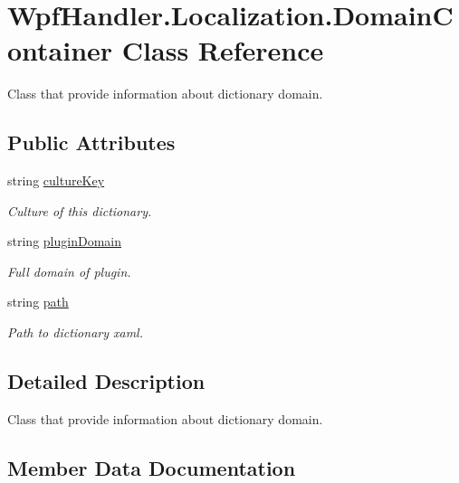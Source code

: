 \hypertarget{class_wpf_handler_1_1_localization_1_1_domain_container}{}\section{Wpf\+Handler.\+Localization.\+Domain\+Container Class Reference}
\label{class_wpf_handler_1_1_localization_1_1_domain_container}


Class that provide information about dictionary domain.  


\subsection*{Public Attributes}
\begin{DoxyCompactItemize}
\item 
string \mbox{\hyperlink{class_wpf_handler_1_1_localization_1_1_domain_container_a38f0df8c27c95e4250a31fa0c843c1b0}{culture\+Key}}
\begin{DoxyCompactList}\small\item\em Culture of this dictionary. \end{DoxyCompactList}\item 
string \mbox{\hyperlink{class_wpf_handler_1_1_localization_1_1_domain_container_a7ae59873c6462b5ad0a8331ad39c5ade}{plugin\+Domain}}
\begin{DoxyCompactList}\small\item\em Full domain of plugin. \end{DoxyCompactList}\item 
string \mbox{\hyperlink{class_wpf_handler_1_1_localization_1_1_domain_container_a21cb28dec2062a288eca31a2f62c68c1}{path}}
\begin{DoxyCompactList}\small\item\em Path to dictionary xaml. \end{DoxyCompactList}\end{DoxyCompactItemize}


\subsection{Detailed Description}
Class that provide information about dictionary domain. 



\subsection{Member Data Documentation}
\mbox{\label{class_wpf_handler_1_1_localization_1_1_domain_container_a38f0df8c27c95e4250a31fa0c843c1b0}} 
